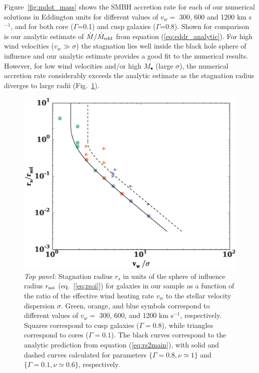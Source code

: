 \documentclass[usenatbib,fleqn]{mn2e}
\newcommand{\vwO}{v_{w}}
\newcommand{\densSlope}{\nu}
\begin{document}
 Figure~\ref{fig:mdot_mass} shows the SMBH accretion rate for each of our numerical solutions in Eddington units for different values of $\vwO =$ 300, 600 and 1200 km s$^{-1}$, and for both core ($\Gamma$=0.1) and cusp galaxies ($\Gamma$=0.8).  Shown for comparison is our analytic estimate of $\dot{M}/\dot{M}_{\rm edd}$ from equation (\ref{eq:eddr_analytic}).  For high wind velocities ($v_{w} \gg \sigma$) the stagnation lies well inside the black hole sphere of influence and our analytic estimate provides a good fit to the numerical results.  However, for low wind velocities and/or high $M_{\bullet}$ (large $\sigma$), the numerical accretion rate considerably exceeds the analytic estimate as the stagnation radius diverges to large radii (Fig.~\ref{fig:stag}).  

\begin{figure}
  \includegraphics[width=\columnwidth]{rs.eps}
  \caption{\label{fig:stag} \emph{Top panel:} Stagnation radius
    $r_{s}$ in units of the sphere of influence radius $r_{\rm soi}$
    (eq.~[\ref{eq:rsoi}]) for galaxies in our sample as a function of
    the ratio of the effective wind heating rate $v_{w}$ to the
    stellar velocity dispersion $\sigma$.  Green, orange, and blue
    symbols correspond to different values of $v_{w} =$ 300, 600, and
    1200 km s$^{-1}$, respectively.  Squares correspond to cusp
    galaxies ($\Gamma = 0.8$), while triangles correspond to cores
    ($\Gamma = 0.1$). The black curves correspond to the analytic
    prediction from equation (\ref{eq:rs2main}), with solid and dashed
    curves calculated for parameters $\{\Gamma=0.8, \densSlope\simeq1\}$ and
    $\{\Gamma=0.1,\densSlope\simeq0.6\}$, respectively. }
\end{figure}
\end{document}
